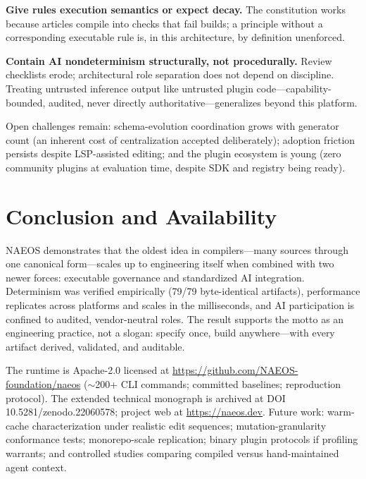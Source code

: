 \documentclass[sigconf,nonacm]{acmart}
\begin{document}
\textbf{Give rules execution semantics or expect decay.} The constitution works because articles compile into checks that fail builds; a principle without a corresponding executable rule is, in this architecture, by definition unenforced.

\textbf{Contain AI nondeterminism structurally, not procedurally.} Review checklists erode; architectural role separation does not depend on discipline. Treating untrusted inference output like untrusted plugin code---capability-bounded, audited, never directly authoritative---generalizes beyond this platform.

Open challenges remain: schema-evolution coordination grows with generator count (an inherent cost of centralization accepted deliberately); adoption friction persists despite LSP-assisted editing; and the plugin ecosystem is young (zero community plugins at evaluation time, despite SDK and registry being ready).

\section{Conclusion and Availability}
\label{sec:conclusion}
NAEOS demonstrates that the oldest idea in compilers---many sources through one canonical form---scales up to engineering itself when combined with two newer forces: executable governance and standardized AI integration. Determinism was verified empirically (79/79 byte-identical artifacts), performance replicates across platforms and scales in the milliseconds, and AI participation is confined to audited, vendor-neutral roles. The result supports the motto as an engineering practice, not a slogan: specify once, build anywhere---with every artifact derived, validated, and auditable.

The runtime is Apache-2.0 licensed at \url{https://github.com/NAEOS-foundation/naeos} ($\sim$200+ CLI commands; committed baselines; reproduction protocol). The extended technical monograph is archived at DOI 10.5281/zenodo.22060578; project web at \url{https://naeos.dev}. Future work: warm-cache characterization under realistic edit sequences; mutation-granularity conformance tests; monorepo-scale replication; binary plugin protocols if profiling warrants; and controlled studies comparing compiled versus hand-maintained agent context.



\end{document}
